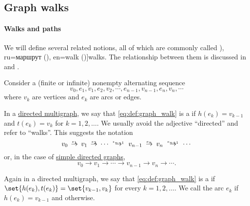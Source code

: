 \subsection{Graph walks}\label{subsec:graph_walks}

\paragraph{Walks and paths}

\begin{definition}\label{def:graph_walk}\mimprovised
  We will define several related notions, all of which are commonly called \term[bg=маршрут (\cite[11]{Мирчев2001Графи}), ru=маршрут (\cite[23]{ЕмеличевИПр1990Графы}), en=walk (\cite[10]{Diestel2017Graphs})]{walks}. The relationship between them is discussed in  and .

  Consider a (finite or infinite) nonempty alternating sequence
  \begin{equation}\label{eq:def:graph_walk}
    v_0, e_1, v_1, e_2, v_2, \cdots, e_{n-1}, v_{n-1}, e_n, v_n, \cdots
  \end{equation}
  where \( v_k \) are vertices and \( e_k \) are arcs or edges.

  \begin{thmenum}[series=def:graph_walk]
     In a \hyperref[def:directed_multigraph]{directed multigraph}, we say that \eqref{eq:def:graph_walk} is a  if \( h(e_k) = v_{k-1} \) and \( t(e_k) = v_k \) for \( k = 1, 2, \ldots \). We usually avoid the adjective \enquote{directed} and refer to \enquote{walks}. This suggests the notation
    \begin{equation}\label{eq:def:graph_walk/directed}
      v_0 \reloset {e_1} \to v_1 \reloset {e_2} \to \cdots \reloset {e_{n-1}} \to v_{n-1} \reloset {e_n} \to v_n \reloset {e_{n+1}} \to \cdots
    \end{equation}
    or, in the case of \hyperref[def:directed_graph]{simple directed graphs},
    \begin{equation*}
      v_0 \to v_1 \to \cdots \to v_{n-1} \to v_n \to \cdots.
    \end{equation*}

     Again in a directed multigraph, we say that \eqref{eq:def:graph_walk} is a  if \( \set{ h(e_k), t(e_k) } = \set{ v_{k-1}, v_k } \) for every \( k = 1, 2, \ldots \). We call the arc \( e_k \)  if \( h(e_k) = v_{k-1} \) and  otherwise.


\end{thmenum}
\end{definition}
